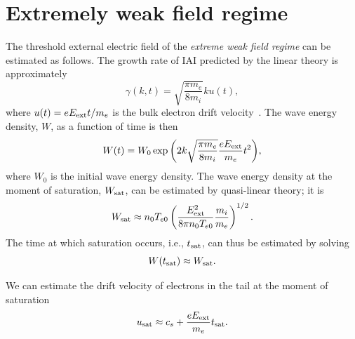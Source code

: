 \documentclass[%
 reprint,
 amsmath,
 amssymb,
 aps,
 prx,
floatfix,
superscriptaddress
]{revtex4-2}
\begin{document}
\section{Extremely weak field regime \label{app:4}}
The threshold external electric field of the {\it extreme weak field regime} can be estimated as follows.
The growth rate of IAI predicted by the linear theory is approximately
\begin{equation}
    \gamma (k, t) = \sqrt{\frac{\pi m_e}{8m_i}} ku (t),
\end{equation}
where $u(t) = eE_{\rm{ext}}t/m_e$ is the bulk electron drift velocity~\cite{schekochihin2022lectures}.
The wave energy density, $W$, as a function of time is then 
\begin{equation}
    W(t) =  W_0 \exp{ \left(2k \sqrt{\frac{\pi m_e}{8m_i}} \frac{eE_{\rm{ext}}}{m_e} t^2\right)},
\end{equation}
where $W_0$ is the initial wave energy density.
The wave energy density at the moment of saturation, $W_{\rm{sat}}$, can be estimated by quasi-linear theory; it is 
\begin{equation}
\label{sup:eq:wsat}
    W_{\rm{sat}} \approx n_0 T_{e0} \left( \frac{E_{\rm{ext}}^2}{8\pi n_0 T_{e0}} \frac{m_i}{m_e}\right)^{1/2}.
\end{equation}
The time at which saturation occurs, i.e., $t_{\rm{sat}}$, can thus be estimated by solving
\begin{equation}
\label{sup:eq:tsat_eq}
    W(t_{\rm{sat}})  \approx  W_{\rm{sat}}.
\end{equation}

We can estimate the drift velocity of electrons in the tail at the moment of saturation
\begin{equation}
    u_{\rm{sat}} \approx c_s + \frac{e E_{\rm{ext}}}{m_e}t_{\rm{sat}}.
\end{equation}
\end{document}
